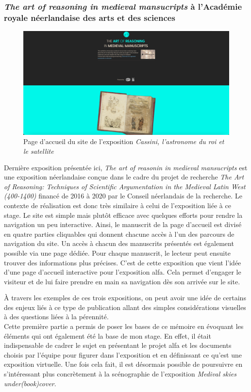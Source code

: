 	\subsubsection{\textit{The art of reasoning in medieval mansucripts} à l'Académie royale néerlandaise des arts et des sciences}
	\begin{figure}[h]
	\caption{Page d'accueil du site de l'exposition \textit{Cassini, l'astronome du roi et le satellite}}
	\includegraphics[scale=0.3, angle=0]{images/partie1/expositions/expo-art-of-reasoning.png}
    \centering
    \end{figure}
    Dernière exposition présentée ici, \textit{The art of reasonin in medieval mansucripts} est une exposition néerlandaise conçue dans le cadre du projet de recherche \textit{The Art of Reasoning: Techniques of Scientific Argumentation in the Medieval Latin West (400-1400)} financé de 2016 à 2020 par le Conseil néerlandais de la recherche. Le contexte de réalisation est donc très similaire à celui de l'exposition liée à ce stage. Le site est simple mais plutôt efficace avec quelques efforts pour rendre la navigation un peu interactive. Ainsi, le manuscrit de la page d'accueil est divisé en quatre parties cliquables qui donnent chacune accès à l'un des parcours de navigation du site. Un accès à chacun des manuscrits présentés est également possible via une page dédiée. Pour chaque manuscrit, le lecteur peut ensuite trouver des informations plus précises. C'est de cette exposition que vient l'idée d'une page d'accueil interactive pour l'exposition \acrshort{alfa}. Cela permet d'engager le visiteur et de lui faire prendre en main sa navigation dès son arrivée sur le site. 
    
    À travers les exemples de ces trois expositions, on peut avoir une idée de certains des enjeux liés à ce type de publication allant des simples considérations visuelles à des questions liées à la pérennité. \\
    
    Cette première partie a permis de poser les bases de ce mémoire en évoquant les éléments qui ont également été la base de mon stage. En effet, il était indispensable de cadrer le sujet en présentant le projet \acrshort{alfa} et les documents choisis par l'équipe pour figurer dans l'exposition et en définissant ce qu'est une exposition virtuelle. Une fois cela fait, il est désormais possible de poursuivre en s'intéressant plus concrètement à la scénographie de l'exposition \textit{Medival skies under(book)cover}.